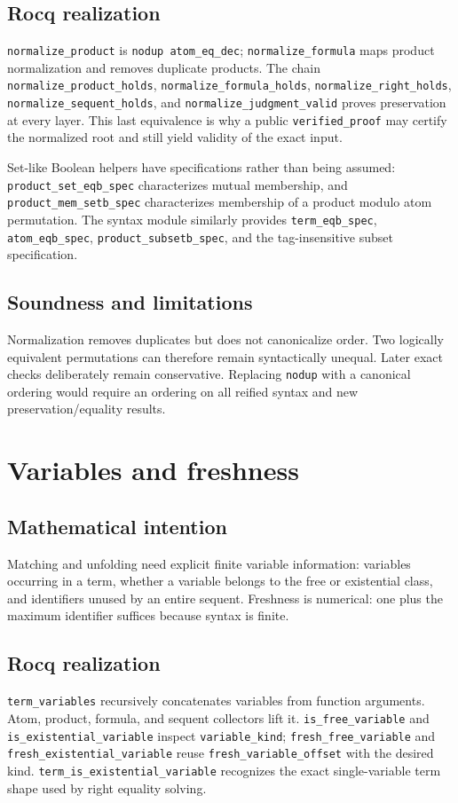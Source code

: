 \documentclass[11pt,oneside]{book}
\DeclareRobustCommand{\code}[1]{\nolinkurl{#1}}
\newcommand{\mathintent}{\subsection*{Mathematical intention}}
\newcommand{\rocqreal}{\subsection*{Rocq realization}}
\newcommand{\soundlim}{\subsection*{Soundness and limitations}}
\begin{document}
\rocqreal

\code{normalize_product} is \code{nodup atom_eq_dec};
\code{normalize_formula} maps product normalization and removes duplicate
products.  The chain
\code{normalize_product_holds}, \code{normalize_formula_holds},
\code{normalize_right_holds}, \code{normalize_sequent_holds}, and
\code{normalize_judgment_valid} proves preservation at every layer.  This last
equivalence is why a public \code{verified_proof} may certify the normalized
root and still yield validity of the exact input.

Set-like Boolean helpers have specifications rather than being assumed:
\code{product_set_eqb_spec} characterizes mutual membership, and
\code{product_mem_setb_spec} characterizes membership of a product modulo atom
permutation.  The syntax module similarly provides \code{term_eqb_spec},
\code{atom_eqb_spec}, \code{product_subsetb_spec}, and the tag-insensitive
subset specification.

\soundlim

Normalization removes duplicates but does not canonicalize order.  Two
logically equivalent permutations can therefore remain syntactically unequal.
Later exact checks deliberately remain conservative.  Replacing \code{nodup}
with a canonical ordering would require an ordering on all reified syntax and
new preservation/equality results.

\section{Variables and freshness}

\mathintent

Matching and unfolding need explicit finite variable information: variables
occurring in a term, whether a variable belongs to the free or existential
class, and identifiers unused by an entire sequent.  Freshness is numerical:
one plus the maximum identifier suffices because syntax is finite.

\rocqreal

\code{term_variables} recursively concatenates variables from function
arguments.  Atom, product, formula, and sequent collectors lift it.
\code{is_free_variable} and \code{is_existential_variable} inspect
\code{variable_kind}; \code{fresh_free_variable} and
\code{fresh_existential_variable} reuse \code{fresh_variable_offset} with the
desired kind.  \code{term_is_existential_variable} recognizes the exact
single-variable term shape used by right equality solving.
\end{document}
